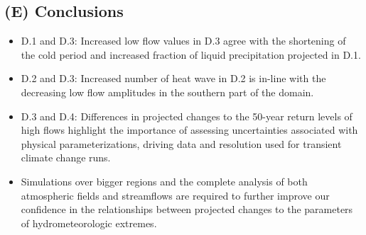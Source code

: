 \documentclass[a0,landscape]{a0poster}
\begin{document}
\begin{multicols*}{4}

\color{SaddleBrown} %

\section*{(E) Conclusions}
\begin{minipage}[t]{\linewidth}
\begin{itemize}
\item D.1 and D.3: Increased low flow values in D.3 agree with
the shortening of the cold period and increased fraction of liquid precipitation
projected in D.1.

\item D.2 and D.3: Increased number of heat wave in D.2 is
in-line with the decreasing low flow amplitudes in the southern part of the
domain.

\item D.3 and D.4: Differences in projected changes to the 50-year return levels
of high flows highlight the importance of assessing uncertainties associated
with physical parameterizations, driving data and resolution used for transient
climate change runs.

\item Simulations over bigger regions and the complete analysis of both
atmospheric fields and streamflows are required to further improve our
confidence in the relationships between projected changes to the parameters of
hydrometeorologic extremes.
\end{itemize}
\end{minipage}
\color{DarkSlateGray} %





\end{multicols*}
\end{document}
